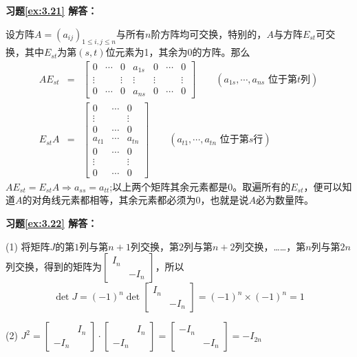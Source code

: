 \documentclass[a4paper]{book}
\newcommand{\enum}{\begin{list}{}{\setlength{\leftmargin}{0pt} \setlength{\itemindent}{2.5em} \setlength{\listparindent}{2em}}}
\begin{document}
\vspace{1.5em}

\textbf{习题\ref{ex:3.21} 解答：}

设方阵$A = (a_{ij})_{1 \leqslant i,j \leqslant n}$与所有$n$阶方阵均可交换，特别的，$A$与方阵$E_{st}$可交换，其中$E_{st}$为第$(s,t)$位元素为1，其余为0的方阵。那么
\begin{eqnarray*}
AE_{st} & = & \begin{bmatrix} 0 & \cdots & 0 & a_{1s} & 0 & \cdots & 0 \\ \vdots & & \vdots & \vdots & \vdots & & \vdots \\ 0 & \cdots & 0 & a_{ns} & 0 & \cdots & 0 \end{bmatrix} \qquad (a_{1s},\cdots,a_{ns}\text{ 位于第$t$列}) \\
E_{st}A & = & \begin{bmatrix} 0 & \cdots & 0 \\ \vdots & & \vdots \\ 0 & \cdots & 0 \\ a_{t1} & \cdots & a_{tn} \\ 0 & \cdots & 0 \\ \vdots & & \vdots \\ 0 & \cdots & 0 \end{bmatrix} \qquad (a_{t1}, \cdots, a_{tn}\text{ 位于第$s$行})
\end{eqnarray*}
$AE_{st} = E_{st}A \Rightarrow a_{ss} = a_{tt}$;以上两个矩阵其余元素都是$0$。取遍所有的$E_{st}$，便可以知道$A$的对角线元素都相等，其余元素都必须为$0$，也就是说$A$必为数量阵。

\vspace{1.5em}

\textbf{习题\ref{ex:3.22} 解答：}

\enum
\item[(1)] 将矩阵$J$的第$1$列与第$n+1$列交换，第$2$列与第$n+2$列交换，……，第$n$列与第$2n$列交换，得到的矩阵为$\begin{bmatrix} I_n & \\ & -I_n \end{bmatrix}$，所以
$$\det J = (-1)^n \det\begin{bmatrix} I_n & \\ & -I_n \end{bmatrix} = (-1)^n\times(-1)^n = 1$$

\item[(2)] $J^2 = \begin{bmatrix} & I_n \\ -I_n & \end{bmatrix} \cdot \begin{bmatrix} & I_n \\ -I_n & \end{bmatrix} = \begin{bmatrix} -I_n & \\ & -I_n \end{bmatrix} = -I_{2n}$
\end{list}
\end{document}
